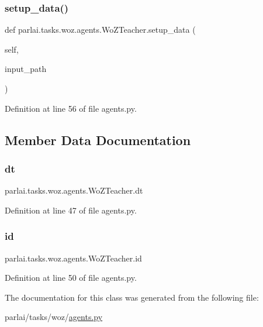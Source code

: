 \subsubsection{\texorpdfstring{setup\+\_\+data()}{setup\_data()}}
{\footnotesize\ttfamily def parlai.\+tasks.\+woz.\+agents.\+Wo\+Z\+Teacher.\+setup\+\_\+data (\begin{DoxyParamCaption}\item[{}]{self,  }\item[{}]{input\+\_\+path }\end{DoxyParamCaption})}



Definition at line 56 of file agents.\+py.



\subsection{Member Data Documentation}
\mbox{\label{classparlai_1_1tasks_1_1woz_1_1agents_1_1WoZTeacher_adf532edfa3f156cb1fd24d8e562f166f}} 
\subsubsection{\texorpdfstring{dt}{dt}}
{\footnotesize\ttfamily parlai.\+tasks.\+woz.\+agents.\+Wo\+Z\+Teacher.\+dt}



Definition at line 47 of file agents.\+py.

\mbox{\label{classparlai_1_1tasks_1_1woz_1_1agents_1_1WoZTeacher_a927f157a2d982c57779128551ba1be86}} 
\subsubsection{\texorpdfstring{id}{id}}
{\footnotesize\ttfamily parlai.\+tasks.\+woz.\+agents.\+Wo\+Z\+Teacher.\+id}



Definition at line 50 of file agents.\+py.



The documentation for this class was generated from the following file\+:\begin{DoxyCompactItemize}
\item 
parlai/tasks/woz/\hyperlink{parlai_2tasks_2woz_2agents_8py}{agents.\+py}\end{DoxyCompactItemize}
